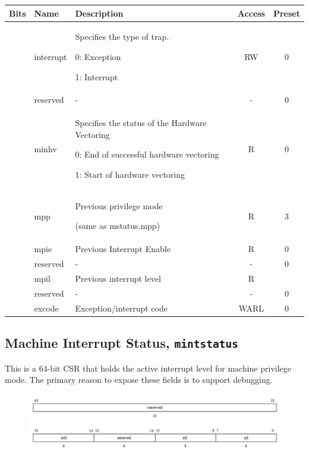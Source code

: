 \vspace{0.5cm}
\begin{table}[H]
    \label{tab:csr_mcause}
        \centering
        \begin{tabular}{l l p{8cm} c c}
         \hline 
         \textbf{Bits} & \textbf{Name} & \textbf{Description} & \textbf{Access} & \textbf{Preset} \\ \hline \hline
         [63] & interrupt & Specifies the type of trap.
         
         0: Exception
         
         1: Interrupt & RW & 0\\ \hline
         [62:31] & reserved & - & - & 0\\ \hline
         [30] & minhv & Specifies the status of the Hardware Vectoring
         
         0: End of successful hardware vectoring
         
         1: Start of hardware vectoring & R & 0\\ \hline
         [29:28] & mpp & Previous privilege mode
         
         (same as mstatus.mpp) & R & 3\\ \hline
         [27] & mpie & Previous Interrupt Enable & R & 0\\ \hline
         [26:24] & reserved & - & - & 0\\ \hline
         [23:16] & mpil & Previous interrupt level & R \\ \hline
         [15:12] & reserved & - & - & 0\\ \hline
         [11:0] & excode & Exception/interrupt code & WARL & 0\\ \hline
        \end{tabular}
\end{table}
\vspace{0.5cm}

\subsection{Machine Interrupt Status, \texttt{mintstatus}}
\label{subsec:mintstatus}

This is a 64-bit CSR that holds the active interrupt level for machine privilege mode. The primary reason to expose these fields is to support debugging.

\vspace{0.5cm}
\begin{figure}[H]
    \centering
    \includegraphics[width = 15.25cm]{images/csr_mintstatus.png}
    \label{fig:csr_mintstatus}
\end{figure}
\vspace{0.25cm}

